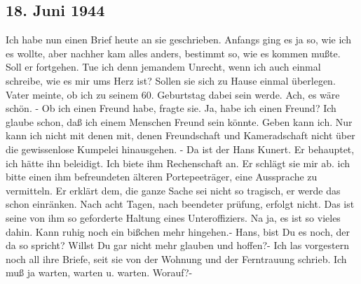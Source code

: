 \subsection{18. Juni 1944}

Ich habe nun einen Brief heute an sie geschrieben.
Anfangs ging es ja so, wie ich es wollte, aber nachher kam alles anders, bestimmt so, wie es kommen mu{\ss}te.
Soll er fortgehen.
Tue ich denn jemandem Unrecht, wenn ich auch einmal schreibe, wie es mir ums Herz ist?
Sollen sie sich zu Hause einmal \"{u}berlegen.
Vater meinte, ob ich zu seinem 60. Geburtstag dabei sein werde.
Ach, es w\"{a}re sch\"{o}n.
- Ob ich einen Freund habe, fragte sie.
Ja, habe ich einen Freund?
Ich glaube schon, da{\ss} ich einem Menschen Freund sein k\"{o}nnte.
Geben kann ich.
Nur kann ich nicht mit denen mit, denen Freundschaft und Kameradschaft nicht \"{u}ber die gewissenlose Kumpelei hinausgehen.
- Da ist der Hans Kunert.
Er behauptet, ich h\"{a}tte ihn beleidigt.
Ich biete ihm Rechenschaft an.
Er schl\"{a}gt sie mir ab.
ich bitte einen ihm befreundeten \"{a}lteren Portepeetr\"{a}ger, eine Aussprache zu vermitteln.
Er erkl\"{a}rt dem, die ganze Sache sei nicht so tragisch, er werde das schon einr\"{a}nken.
Nach acht Tagen, nach beendeter pr\"{u}fung, erfolgt nicht.
Das ist seine von ihm so geforderte Haltung eines Unteroffiziers.
Na ja, es ist so vieles dahin.
Kann ruhig noch ein bi{\ss}chen mehr hingehen.-
Hans, bist Du es noch, der da so spricht?
Willst Du gar nicht mehr glauben und hoffen?-
Ich las vorgestern noch all ihre Briefe, seit sie von der Wohnung und der Ferntrauung schrieb.
Ich mu{\ss} ja warten, warten u. warten.
Worauf?-
\clearpage
